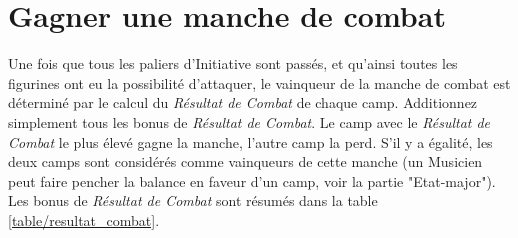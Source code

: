 \section{Gagner une manche de combat}

Une fois que tous les paliers d'Initiative sont passés, et qu'ainsi toutes les figurines ont eu la possibilité d'attaquer, le vainqueur de la manche de combat est déterminé par le calcul du \emph{Résultat de Combat} de chaque camp. Additionnez simplement tous les bonus de \emph{Résultat de Combat}. Le camp avec le \emph{Résultat de Combat} le plus élevé gagne la manche, l'autre camp la perd. S'il y a égalité, les deux camps sont considérés comme vainqueurs de cette manche (un Musicien peut faire pencher la balance en faveur d'un camp, voir la partie "Etat-major"). Les bonus de \emph{Résultat de Combat} sont résumés dans la table \ref{table/resultat_combat}.

